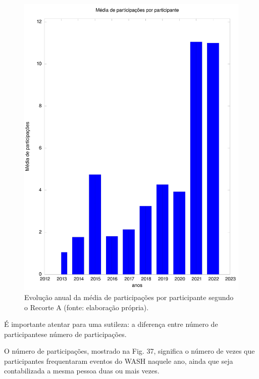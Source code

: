 \documentclass[
12pt,		%
openright,	%
twoside,  %
a4paper,			%
chapter=TITLE,		%
english,			%
french,				%
spanish,			%
brazil				%
]{USPSC-classe/USPSC}
\begin{document}
\begin{figure}[max size={\textwidth}{\textheight}]
\begin{minipage}[b]{0.4\linewidth}
                \includegraphics[width=1.0\linewidth]{../../imagens/output-media-participacoes.jpeg}
                \caption{Evolu\c{c}\~ao anual da m\'edia de participa\c{c}\~oes por participante segundo o Recorte A (fonte: elabora\c{c}\~ao pr\'opria).}
                \label{a8f2d72073b88290f9b8731b144383d2f7c4dc4b}
\end{minipage}%
\hspace{0.5cm}
\end{figure}



\'E importante atentar para uma sutileza: a diferen\c{c}a entre \textquotedbl n\'umero de participantes\textquotedbl  e \textquotedbl n\'umero de participa\c{c}\~oes\textquotedbl .








O n\'umero de participa\c{c}\~oes, mostrado na Fig. 37, significa o n\'umero de vezes que participantes frequentaram eventos do WASH naquele ano, ainda que seja contabilizada a mesma pessoa duas ou mais vezes.
\end{document}
